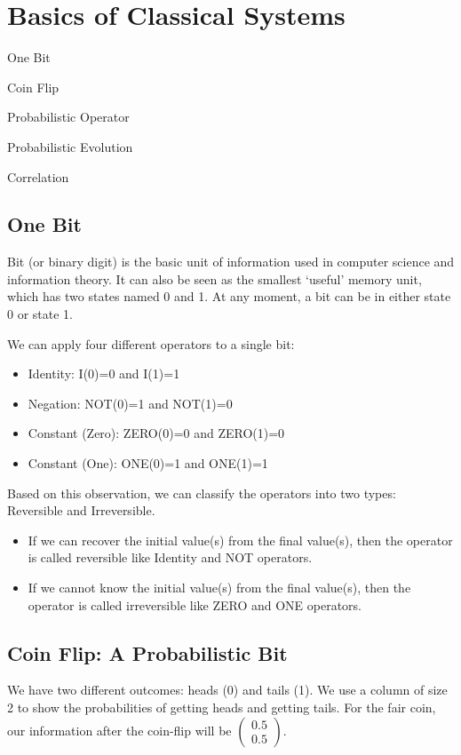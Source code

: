 \section{Basics of Classical Systems}
\begin{introduction}
	\item One Bit
	\item Coin Flip
	\item Probabilistic Operator
	\item Probabilistic Evolution
	\item Correlation
\end{introduction}

\subsection{One Bit}
Bit (or binary digit) is the basic unit of information used in computer science and information theory.
It can also be seen as the smallest `useful' memory unit, which has two states named 0 and 1.
At any moment, a bit can be in either state 0 or state 1.

We can apply four different operators to a single bit:
\begin{itemize}
	\item Identity: I(0)=0 and I(1)=1
	\item Negation: NOT(0)=1 and NOT(1)=0
	\item Constant (Zero): ZERO(0)=0 and ZERO(1)=0
	\item Constant (One): ONE(0)=1 and ONE(1)=1
\end{itemize}

Based on this observation, we can classify the operators into two types: Reversible and Irreversible.
\begin{itemize}
	\item If we can recover the initial value(s) from the final value(s), then the operator is called reversible like Identity and NOT operators.
	\item If we cannot know the initial value(s) from the final value(s), then the operator is called irreversible like ZERO and ONE operators.
\end{itemize}

\subsection{Coin Flip: A Probabilistic Bit}
We have two different outcomes: heads (0) and tails (1).
We use a column of size 2 to show the probabilities of getting heads and getting tails.
For the fair coin, our information after the coin-flip will be $\begin{pmatrix} 0.5\\0.5
\end{pmatrix}$.


